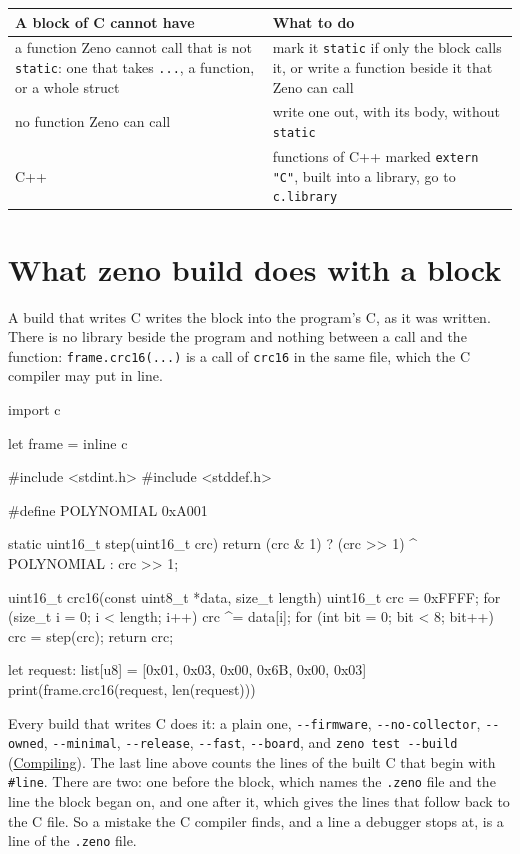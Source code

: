 \begin{center}
\begin{tabular}{P{6.2cm}P{6.6cm}}
\toprule
A block of C cannot have & What to do \\
\midrule
a function Zeno cannot call that is not \verb|static|: one that takes
  \verb|...|, a function, or a whole struct & mark it \verb|static| if
  only the block calls it, or write a function beside it that Zeno can
  call \\
no function Zeno can call & write one out, with its body, without
  \verb|static| \\
C++ & functions of C++ marked \verb|extern "C"|, built into a library,
  go to \verb|c.library| \\
\bottomrule
\end{tabular}
\end{center}

\section{What zeno build does with a block}

A build that writes C writes the block into the program's C, as it
was written. There is no library beside the program and nothing
between a call and the function: \verb|frame.crc16(...)| is a call of
\verb|crc16| in the same file, which the C compiler may put in line.

\begin{zeno}[file=frame.zeno, dir=blocks, show=no, cmd=zeno build {file} ;; ./frame ;; zeno build --no-collector --minimal {file} ;; ./frame ;; grep -c "^#line" frame.c]
import c

let frame = inline c {
    #include <stdint.h>
    #include <stddef.h>

    #define POLYNOMIAL 0xA001

    static uint16_t step(uint16_t crc) {
        return (crc & 1) ? (crc >> 1) ^ POLYNOMIAL : crc >> 1;
    }

    uint16_t crc16(const uint8_t *data, size_t length) {
        uint16_t crc = 0xFFFF;
        for (size_t i = 0; i < length; i++) {
            crc ^= data[i];
            for (int bit = 0; bit < 8; bit++) {
                crc = step(crc);
            }
        }
        return crc;
    }
}

let request: list[u8] = [0x01, 0x03, 0x00, 0x6B, 0x00, 0x03]
print(frame.crc16(request, len(request)))
\end{zeno}

Every build that writes C does it: a plain one, \verb|--firmware|,
\verb|--no-collector|, \verb|--owned|, \verb|--minimal|,
\verb|--release|, \verb|--fast|, \verb|--board|, and
\verb|zeno test --build| (\hyperref[ch-compiling]{Compiling}). The
last line above counts the lines of the built C that begin with
\verb|#line|. There are two: one before the block, which names the
\verb|.zeno| file and the line the block began on, and one after it,
which gives the lines that follow back to the C file. So a mistake
the C compiler finds, and a line a debugger stops at, is a line of the
\verb|.zeno| file.

